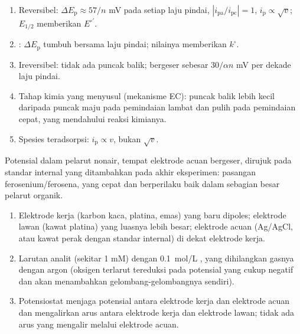 \begin{method}\label{met:b3:electrode-kinetics:cv-diagnosis}
\begin{enumerate}
  \item Reversibel: $\Delta E_{\mathrm p} \approx 57/n$ mV pada setiap laju pindai,
        $|i_{\mathrm{pa}}/i_{\mathrm{pc}}| = 1$, $i_{\mathrm p} \propto \sqrt v$;
        $E_{1/2}$ memberikan $E^{\circ\prime}$.
  \item {}: $\Delta E_{\mathrm p}$ tumbuh bersama laju pindai; nilainya
        memberikan $k^\circ$.
  \item Ireversibel: tidak ada puncak balik;  bergeser sebesar
        $30/\alpha n$ mV per dekade laju pindai.
  \item Tahap kimia yang menyusul (mekanisme EC): puncak balik lebih kecil
        daripada puncak maju pada pemindaian lambat dan pulih pada pemindaian
        cepat, yang mendahului reaksi kimianya.
  \item Spesies teradsorpsi: $i_{\mathrm p} \propto v$, bukan $\sqrt v$.
\end{enumerate}
\end{method}

Potensial dalam pelarut nonair, tempat elektrode acuan bergeser, dirujuk pada
standar internal yang ditambahkan pada akhir eksperimen: pasangan
ferosenium/ferosena, yang cepat dan berperilaku baik dalam sebagian besar
pelarut organik.

\begin{method}\label{met:b3:electrode-kinetics:three-electrode}
\begin{enumerate}
  \item Elektrode kerja (karbon kaca, platina, emas) yang baru dipoles;
        elektrode lawan (kawat platina) yang luasnya lebih besar; elektrode
        acuan (Ag/AgCl, atau kawat perak dengan standar internal) di dekat
        elektrode kerja.
  \item Larutan analit (sekitar 1 mM) dengan \qty{0.1}{mol/L} , yang dihilangkan gasnya dengan argon (oksigen terlarut
        tereduksi pada potensial yang cukup negatif dan akan menambahkan
        gelombang-gelombangnya sendiri).
  \item Potensiostat menjaga potensial antara elektrode kerja dan elektrode
        acuan dan mengalirkan arus antara elektrode kerja dan elektrode lawan;
        tidak ada arus yang mengalir melalui elektrode acuan.
\end{enumerate}
\end{method}

